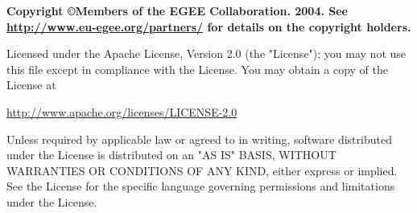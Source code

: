%
\vfill{}

{\bf
Copyright \copyright Members of the EGEE Collaboration. 2004.  See
\href{http://www.eu-egee.org/partners/}{http://www.eu-egee.org/partners/} for
details on the copyright holders.  

Licensed under the Apache License, Version 2.0 (the "License"); you may not use
this file except in compliance with the License.  You may obtain a copy of the
License at 

\begin{center}
\href{http://www.apache.org/licenses/LICENSE-2.0}{http://www.apache.org/licenses/LICENSE-2.0}
\end{center}

Unless required by applicable law or agreed to in writing, software distributed
under the License is distributed on an "AS IS" BASIS, WITHOUT WARRANTIES OR
CONDITIONS OF ANY KIND, either express or implied.  See the License for the
specific language governing permissions and limitations under the License.
}


